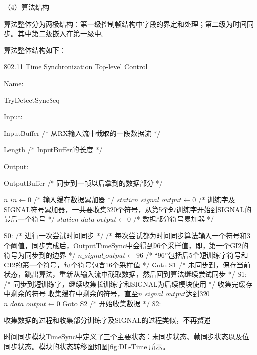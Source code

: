 \documentclass[titlepage]{article}
\numberwithin{figure}{section}
\numberwithin{equation}{section}
\begin{document}
（4）算法结构

算法整体分为两极结构：第一级控制帧结构中字段的界定和处理；第二级为时间同步。其中第二级嵌入在第一级中。

算法整体结构如下：

\begin{algorithm}[H]
\caption{802.11 Time Synchronization Top-level Control}
Name:

TryDetectSyncSeq

Input:
 
InputBuffer /* 从RX输入流中截取的一段数据流 */

Length /* InputBuffer的长度 */

Output:

OutputBuffer /* 同步到一帧以后拿到的数据部分 */

\begin{algorithmic}[1]
\State $n\_in \gets 0$ /* 输入缓存数据累加器 */
\State $static n\_signal\_output \gets 0$ /* 训练字及SIGNAL符号累加器，一共要收集320个符号，从第5个短训练字开始到SIGNAL的最后一个符号 */
\State $static n\_data\_output \gets 0$ /* 数据部分符号累加器 */

\State S0:
\State /* 进行一次尝试时间同步 */
\State /* 每次尝试都为时间同步算法输入一个符号和3个阈值，同步完成后，OutputTimeSync中会得到96个采样值，即，第一个GI2的符号为同步到的边界 */
\State $n\_signal\_output \gets 96$ /* “96”包括后5个短训练字符号和GI2的第一个符号，每个符号包含16个采样值 */
\State Goto S1 
\EndIf
\EndWhile
{}
\State /* 未同步到，保存当前状态，跳出算法，重新从输入流中截取数据，然后回到算法继续尝试同步 */
\EndIf
\State S1:
\State /* 同步到短训练字，继续收集长训练字和SIGNAL为后续模块使用 */
\State 收集完缓存中剩余的符号
\Else
\State 收集缓存中剩余的符号，直至$n\_signal\_output$达到320
\State $n\_data\_output \gets 0$
\State Goto S2 /* 开始收集数据 */
\EndIf
\State S2:

\State 收集数据的过程和收集部分训练字及SIGNAL的过程类似，不再赘述

\end{algorithmic}
\end{algorithm}

时间同步模块TimeSync中定义了三个主要状态：未同步状态、帧同步状态以及位同步状态。模块的状态转移图如图\ref{fig:DL-Time}所示。
\end{document}
